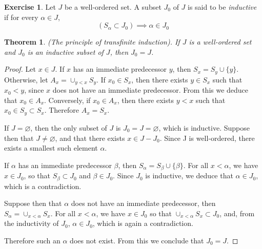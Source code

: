 \documentclass[11pt,a4paper,twoside]{article}
\theoremstyle{definition}
\newcounter{excounter}
\newtheorem{exercise}[excounter]{Exercise}
\theoremstyle{plain}
\newtheorem*{theorem}{Theorem}
\begin{document}
\begin{exercise}

  Let $J$ be a well-ordered set. A subset $J_0$ of $J$ is said to be \emph{inductive} if for every $\alpha \in J$,
  \begin{equation*}
    ( S_\alpha \subset J_0 ) \implies \alpha \in J_0
  \end{equation*}

  \begin{theorem}
    (The principle of transfinite induction). If $J$ is a well-ordered set and $J_0$ is an inductive subset of $J$, then $J_0 = J$.
  \end{theorem}

\end{exercise}

\begin{proof}

  Let $x \in J$. If $x$ has an immediate predecessor $y$, then $S_x = S_y \cup \{ y \}$.
  Otherwise, let $A_x = \cup_{y < x} S_y$. If $x_0 \in S_x$, then there exists $y \in S_x$ such that $x_0 < y$,
  since $x$ does not have an immediate predecessor. From this we deduce that $x_0 \in A_x$. Conversely, if $x_0 \in A_x$,
  then there exists $y < x$ such that $x_0 \in S_y \subset S_x$. Therefore $A_x = S_x$.

  If $J = \varnothing$, then the only subset of $J$ is $J_0 = J = \varnothing$, which is inductive. Suppose then that $J \neq \varnothing$,
  and that there exists $x \in J - J_0$. Since J is well-ordered, there exists a smallest such element $\alpha$.

  If $\alpha$ has an immediate predecessor $\beta$, then $S_\alpha = S_\beta \cup \{ \beta \}$. For all $x < \alpha$, we have
  $x \in J_0$, so that $S_\beta \subset J_0$ and $\beta \in J_0$. Since $J_0$ is inductive, we deduce that $\alpha \in J_0$,
  which is a contradiction.

  Suppose then that $\alpha$ does not have an immediate predecessor, then $S_\alpha = \cup_{x < \alpha} S_x$. For all $x < \alpha$, we have
  $x \in J_0$ so that $\cup_{x < \alpha} S_x \subset J_0$, and, from the inductivity of $J_0$, $\alpha \in J_0$, which is again
  a contradiction.

  Therefore such an $\alpha$ does not exist. From this we conclude that $J_0 = J$.

\end{proof}
\end{document}
